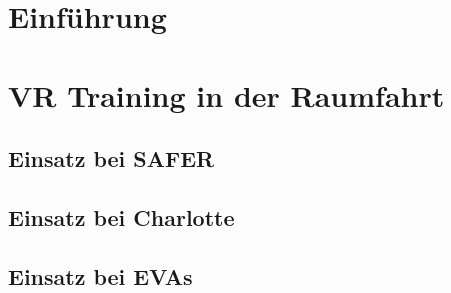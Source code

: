 \documentclass[
    12pt,
    a4paper,
    doubleside,
    BCOR=10mm,
    parskip=half,
    ngerman
]{scrbook}
\begin{document}
\pagestyle{empty}


\hypertarget{contents}{}
\tableofcontents

\newpage
\pagestyle{fancy}

\chapter{Einführung}

\chapter{VR Training in der Raumfahrt}\label{sec:raumfahrt}

\section{Einsatz bei SAFER}\label{sec:raumfahrt-safer}

\section{Einsatz bei Charlotte}\label{sec:raumfahrt-charlotte}

\section{Einsatz bei EVAs}\label{sec:raumfahrt-eva}

\end{document}
